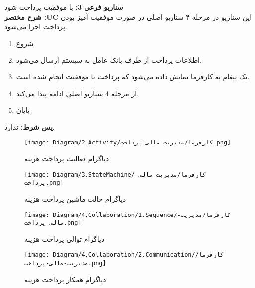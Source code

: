 \noindent
\textbf{سناريو فرعی 3:}
با موفقیت پرداخت ‌شود
\\
\textbf{شرح مختصر :UC}
این سناریو در مرحله ۴ سناریو اصلی در صورت موفقیت آمیز بودن پرداخت اجرا می‌شود.
\begin{enumerate}
\item
شروع
\item
اطلاعات پرداخت از طرف بانک عامل به سیستم ارسال می‌شود.
\item
یک پیغام به کارفرما نمایش داده می‌شود که پرداخت با موفقیت انجام شده است.
\item
از مرحله 4 سناریو اصلی ادامه پیدا می‌کند.
\item
پایان
\end{enumerate}

\noindent
\textbf{پس شرط:}
ندارد.




\begin{figure}[H]
	\centering
	\texttt{[image: Diagram/2.Activity/کارفرما/مدیریت-مالی-پرداخت.png]}
	\caption{دیاگرام فعالیت پرداخت هزینه}
	\label{fig:a:پرداخت-هزینه}
\end{figure}
\begin{figure}[H]
	\centering
	\texttt{[image: Diagram/3.StateMachine/کارفرما/مدیریت-مالی-پرداخت.png]}
	\caption{دیاگرام حالت ماشین پرداخت هزینه}
	\label{fig:sm:پرداخت-هزینه}
\end{figure}
\begin{figure}[H]
	\centering
	\texttt{[image: Diagram/4.Collaboration/1.Sequence/کارفرما/مدیریت-مالی-پرداخت.png]}
	\caption{دیاگرام توالی پرداخت هزینه}
	\label{fig:s:پرداخت-هزینه}
\end{figure}
\begin{figure}[H]
	\centering
	\texttt{[image: Diagram/4.Collaboration/2.Communication/کارفرما/مدیریت-مالی-پرداخت.png]}
	\caption{دیاگرام همکار پرداخت هزینه}
	\label{fig:c:پرداخت-هزینه}
\end{figure}

